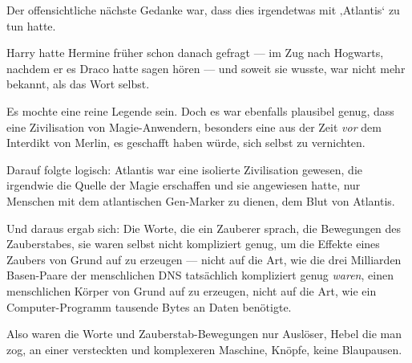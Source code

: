 Der offensichtliche nächste Gedanke war, dass dies irgendetwas mit ‚Atlantis‘ zu tun hatte.

Harry hatte Hermine früher schon danach gefragt — im Zug nach Hogwarts, nachdem er es Draco hatte sagen hören — und soweit sie wusste, war nicht mehr bekannt, als das Wort selbst.

Es mochte eine reine Legende sein. Doch es war ebenfalls plausibel genug, dass eine Zivilisation von Magie-Anwendern, besonders eine aus der Zeit \emph{vor} dem Interdikt von Merlin, es geschafft haben würde, sich selbst zu vernichten.

Darauf folgte logisch: Atlantis war eine isolierte Zivilisation gewesen, die irgendwie die Quelle der Magie erschaffen und sie angewiesen hatte, nur Menschen mit dem atlantischen Gen-Marker zu dienen, dem Blut von Atlantis.

Und daraus ergab sich: Die Worte, die ein Zauberer sprach, die Bewegungen des Zauberstabes, sie waren selbst nicht kompliziert genug, um die Effekte eines Zaubers von Grund auf zu erzeugen — nicht auf die Art, wie die drei Milliarden Basen-Paare der menschlichen DNS tatsächlich kompliziert genug \emph{waren}, einen menschlichen Körper von Grund auf zu erzeugen, nicht auf die Art, wie ein Computer-Programm tausende Bytes an Daten benötigte.

Also waren die Worte und Zauberstab-Bewegungen nur Auslöser, Hebel die man zog, an einer versteckten und komplexeren Maschine, Knöpfe, keine Blaupausen.

